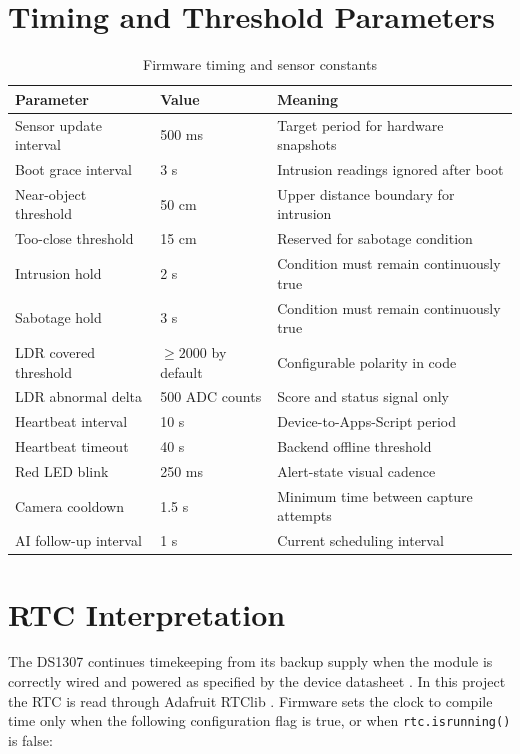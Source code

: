 \documentclass[11pt,a4paper]{report}
\newcommand{\codeid}[1]{\path{#1}}
\begin{document}
\section{Timing and Threshold Parameters}
\begin{table}[H]
\centering
\caption{Firmware timing and sensor constants}
\begin{tabularx}{\textwidth}{p{5.2cm}p{3.0cm}X}
\toprule
\textbf{Parameter} & \textbf{Value} & \textbf{Meaning}\\
\midrule
Sensor update interval & 500 ms & Target period for hardware snapshots\\
Boot grace interval & 3 s & Intrusion readings ignored after boot\\
Near-object threshold & 50 cm & Upper distance boundary for intrusion\\
Too-close threshold & 15 cm & Reserved for sabotage condition\\
Intrusion hold & 2 s & Condition must remain continuously true\\
Sabotage hold & 3 s & Condition must remain continuously true\\
LDR covered threshold & $\geq 2000$ by default & Configurable polarity in code\\
LDR abnormal delta & 500 ADC counts & Score and status signal only\\
Heartbeat interval & 10 s & Device-to-Apps-Script period\\
Heartbeat timeout & 40 s & Backend offline threshold\\
Red LED blink & 250 ms & Alert-state visual cadence\\
Camera cooldown & 1.5 s & Minimum time between capture attempts\\
AI follow-up interval & 1 s & Current scheduling interval\\
\bottomrule
\end{tabularx}
\end{table}

\section{RTC Interpretation}
The DS1307 continues timekeeping from its backup supply when the module is
correctly wired and powered as specified by the device datasheet
\cite{ds1307}. In this project the RTC is read through Adafruit RTClib
\cite{rtclib}. Firmware sets the clock to compile time only when the following
configuration flag is true, or when \texttt{rtc.isrunning()} is false:
\begin{center}
\codeid{FORCE_SET_RTC_TIME_ONCE}
\end{center}
\end{document}
